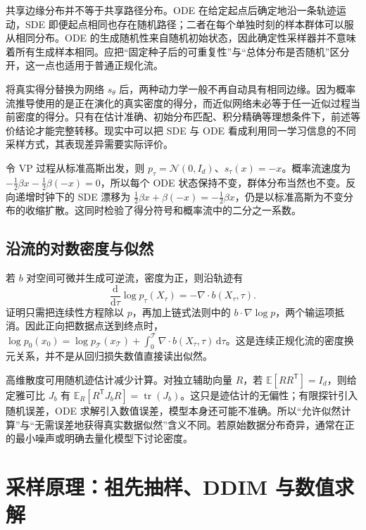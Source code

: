 \documentclass[UTF8,12pt,a4paper,fontset=fandol]{ctexart}
\begin{document}
共享边缘分布并不等于共享路径分布。ODE 在给定起点后确定地沿一条轨迹运动，SDE 即便起点相同也存在随机路径；二者在每个单独时刻的样本群体可以服从相同分布。ODE 的生成随机性来自随机初始状态，因此确定性采样器并不意味着所有生成样本相同。应把“固定种子后的可重复性”与“总体分布是否随机”区分开，这一点也适用于普通正规化流。

将真实得分替换为网络 $s_\theta$ 后，两种动力学一般不再自动具有相同边缘。因为概率流推导使用的是正在演化的真实密度的得分，而近似网络未必等于任一近似过程当前密度的得分。只有在估计准确、初始分布匹配、积分精确等理想条件下，前述等价结论才能完整转移。现实中可以把 SDE 与 ODE 看成利用同一学习信息的不同采样方式，其表现差异需要实际评价。

\begin{example}[标准高斯的时间方向检查]
令 VP 过程从标准高斯出发，则 $p_\tau=\mathcal N(0,I_d)$、$s_\tau(x)=-x$。概率流速度为 $-\tfrac12\beta x-\tfrac12\beta(-x)=0$，所以每个 ODE 状态保持不变，群体分布当然也不变。反向递增时钟下的 SDE 漂移为 $\tfrac12\beta x+\beta(-x)=-\tfrac12\beta x$，仍是以标准高斯为不变分布的收缩扩散。这同时检验了得分符号和概率流中的二分之一系数。
\end{example}

\subsection{沿流的对数密度与似然}
若 $b$ 对空间可微并生成可逆流，密度为正，则沿轨迹有
\begin{equation}
 \frac{\mathrm d}{\mathrm d\tau}\log p_\tau(X_\tau)=-\nabla\cdot b(X_\tau,\tau).
 \label{eq:diff-density-ode}
\end{equation}
证明只需把连续性方程除以 $p$，再加上链式法则中的 $b\cdot\nabla\log p$，两个输运项抵消。因此正向把数据点送到终点时，$\log p_0(x_0)=\log p_{\mathcal T}(x_{\mathcal T})+\int_0^{\mathcal T}\nabla\cdot b(X_\tau,\tau)\,\mathrm d\tau$。这是连续正规化流的密度换元关系，并不是从回归损失数值直接读出似然。

高维散度可用随机迹估计减少计算。对独立辅助向量 $R$，若 $\mathbb E[RR^\mathsf T]=I_d$，则给定雅可比 $J_b$ 有 $\mathbb E_R[R^\mathsf T J_bR]=\operatorname{tr}(J_b)$。这只是迹估计的无偏性；有限探针引入随机误差，ODE 求解引入数值误差，模型本身还可能不准确。所以“允许似然计算”与“无需误差地获得真实数据似然”含义不同。若原始数据分布奇异，通常在正的最小噪声或明确去量化模型下讨论密度。

\section{采样原理：祖先抽样、DDIM 与数值求解}
\label{sec:diff-sampling}
\end{document}
